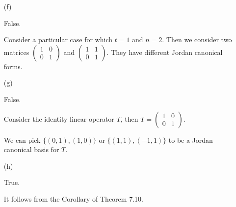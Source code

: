 \begin{Exercise}
\begin{enumerate}[(a)]
\item[(f)]
\begin{answer}
False.
\end{answer}
\begin{solution}
Consider a particular case for which $t = 1$ and $n = 2$. Then we consider two matrices $\begin{pmatrix}
1 & 0 \\
0 & 1
\end{pmatrix}$ and $\begin{pmatrix}
1 & 1 \\
0 & 1
\end{pmatrix}$. They have different Jordan canonical forms.
\end{solution}

\item[(g)]
\begin{answer}
False.
\end{answer}
\begin{solution}
Consider the identity linear operator $T$, then $T = \begin{pmatrix}
1 & 0 \\
0 & 1
\end{pmatrix}$. 

We can pick $\{(0,1),(1,0)\}$ or $\{(1,1),(-1,1)\}$ to be a Jordan canonical basis for $T$.
\end{solution}

\item[(h)]
\begin{answer}
True.
\end{answer}
\begin{solution}
It follows from the Corollary of Theorem 7.10.
\end{solution}

\end{enumerate}
\end{Exercise}